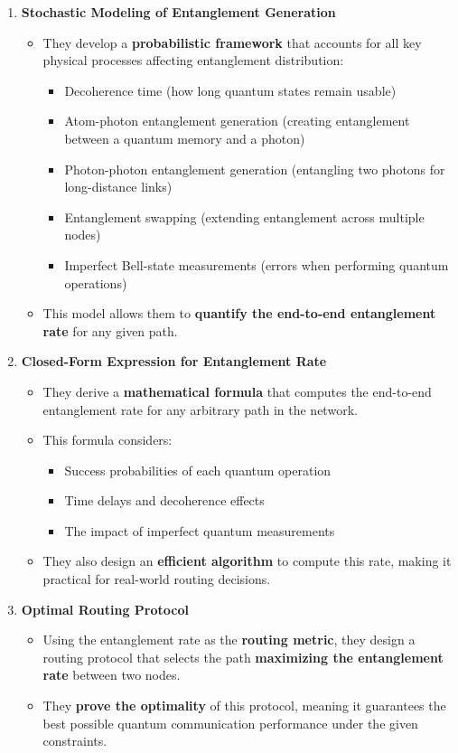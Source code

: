 \documentclass{article}
\begin{document}
\begin{enumerate}
    \item \textbf{Stochastic Modeling of Entanglement Generation}
    \begin{itemize}
        \item They develop a \textbf{probabilistic framework} that accounts for all key physical processes affecting entanglement distribution:
        \begin{itemize}
            \item Decoherence time (how long quantum states remain usable)
            \item Atom-photon entanglement generation (creating entanglement between a quantum memory and a photon)
            \item Photon-photon entanglement generation (entangling two photons for long-distance links)
            \item Entanglement swapping (extending entanglement across multiple nodes)
            \item Imperfect Bell-state measurements (errors when performing quantum operations)
        \end{itemize}
        \item This model allows them to \textbf{quantify the end-to-end entanglement rate} for any given path.
    \end{itemize}
    
    \item \textbf{Closed-Form Expression for Entanglement Rate}
    \begin{itemize}
        \item They derive a \textbf{mathematical formula} that computes the end-to-end entanglement rate for any arbitrary path in the network.
        \item This formula considers:
        \begin{itemize}
            \item Success probabilities of each quantum operation
            \item Time delays and decoherence effects
            \item The impact of imperfect quantum measurements
        \end{itemize}
        \item They also design an \textbf{efficient algorithm} to compute this rate, making it practical for real-world routing decisions.
    \end{itemize}
    
    \item \textbf{Optimal Routing Protocol}
    \begin{itemize}
        \item Using the entanglement rate as the \textbf{routing metric}, they design a routing protocol that selects the path \textbf{maximizing the entanglement rate} between two nodes.
        \item They \textbf{prove the optimality} of this protocol, meaning it guarantees the best possible quantum communication performance under the given constraints.
    \end{itemize}
\end{enumerate}
\end{document}

